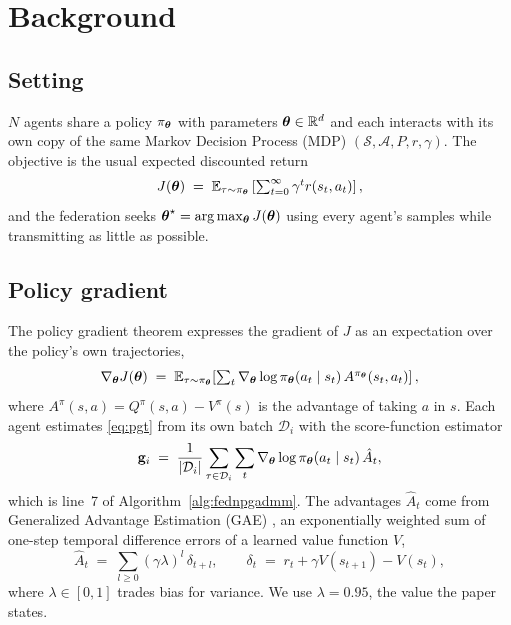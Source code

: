 \section{Background}
\label{sec:background}

\subsection{Setting}

$N$ agents share a policy $\pi_{\boldsymbol{\theta}}$ with parameters $\boldsymbol{\theta} \in \mathbb{R}^d$ and
each interacts with its own copy of the same Markov Decision Process (MDP) $(\mathcal{S}, \mathcal{A},
P, r, \gamma)$. The objective is the usual expected discounted return
\begin{equation}
  J(\boldsymbol{\theta}) \;=\; \mathbb{E}_{\tau \sim \pi_{\boldsymbol{\theta}}}
  \left[\textstyle\sum_{t=0}^{\infty} \gamma^{t} r(s_t, a_t)\right],
\end{equation}
and the federation seeks $\boldsymbol{\theta}^\star = \arg\max_{\boldsymbol{\theta}} J(\boldsymbol{\theta})$ using every
agent's samples while transmitting as little as possible.

\subsection{Policy gradient}

The policy gradient theorem \citep{williams1992reinforce, sutton2000pg}
expresses the gradient of $J$ as an expectation over the policy's own
trajectories,
\begin{equation}
  \nabla_{\boldsymbol{\theta}} J(\boldsymbol{\theta}) \;=\;
  \mathbb{E}_{\tau \sim \pi_{\boldsymbol{\theta}}}\!\left[\textstyle\sum_{t}
  \nabla_{\boldsymbol{\theta}} \log \pi_{\boldsymbol{\theta}}(a_t \mid s_t)\,
  A^{\pi_{\boldsymbol{\theta}}}(s_t, a_t)\right],
  \label{eq:pgt}
\end{equation}
where $A^{\pi}(s,a) = Q^{\pi}(s,a) - V^{\pi}(s)$ is the advantage of taking
$a$ in $s$. Each agent estimates \eqref{eq:pgt} from its own batch
$\mathcal{D}_i$ with the score-function estimator
\begin{equation}
  \mathbf{g}_i \;=\; \frac{1}{|\mathcal{D}_i|}\sum_{\tau \in \mathcal{D}_i}\sum_{t}
  \nabla_{\boldsymbol{\theta}}\log\pi_{\boldsymbol{\theta}}(a_t \mid s_t)\,\hat{A}_t ,
  \label{eq:scorefn}
\end{equation}
which is line~7 of Algorithm~\ref{alg:fednpgadmm}. The advantages
$\hat{A}_t$ come from Generalized Advantage Estimation (GAE)
\citep{schulman2016gae}, an exponentially weighted sum of one-step temporal
difference errors of a learned value function $V$,
\begin{equation}
  \hat{A}_t \;=\; \sum_{l \ge 0} (\gamma\lambda)^l\, \delta_{t+l},
  \qquad
  \delta_t \;=\; r_t + \gamma V(s_{t+1}) - V(s_t),
\end{equation}
where $\lambda \in [0,1]$ trades bias for variance. We use $\lambda = 0.95$,
the value the paper states.

